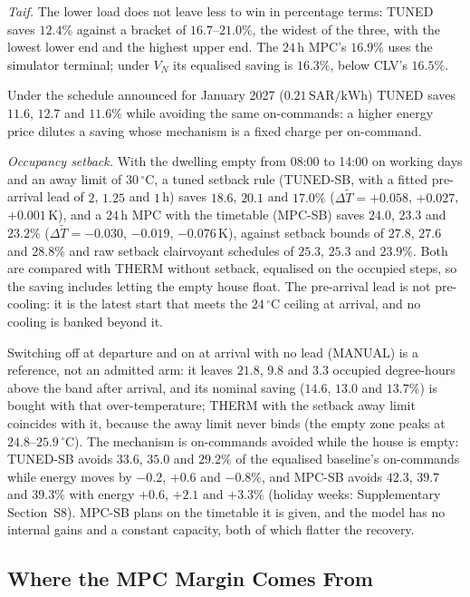 \documentclass[3p,twocolumn,number]{elsarticle}
\newcommand{\SAR}{\text{SAR}}
\newcommand{\kWh}{\text{kWh}}
\begin{document}
\emph{Taif.} The lower load does not leave less to win in percentage terms: TUNED saves $12.4\%$ against a bracket of $16.7$--$21.0\%$, the widest of the three, with the lowest lower end and the highest upper end. The $24\,$h MPC's $16.9\%$ uses the simulator terminal; under $V_N$ its equalised saving is $16.3\%$, below CLV's $16.5\%$.

Under the schedule announced for January 2027 ($0.21\,\SAR/\kWh$) TUNED saves $11.6$, $12.7$ and $11.6\%$ while avoiding the same on-commands: a higher energy price dilutes a saving whose mechanism is a fixed charge per on-command.

\emph{Occupancy setback.} With the dwelling empty from 08:00 to 14:00 on working days and an away limit of $30\,^\circ$C, a tuned setback rule (TUNED-SB, with a fitted pre-arrival lead of $2$, $1.25$ and $1\,$h) saves $18.6$, $20.1$ and $17.0\%$ ($\Delta\tilde T=+0.058$, $+0.027$, $+0.001\,$K), and a $24\,$h MPC with the timetable (MPC-SB) saves $24.0$, $23.3$ and $23.2\%$ ($\Delta\tilde T=-0.030$, $-0.019$, $-0.076\,$K), against setback bounds of $27.8$, $27.6$ and $28.8\%$ and raw setback clairvoyant schedules of $25.3$, $25.3$ and $23.9\%$. Both are compared with THERM without setback, equalised on the occupied steps, so the saving includes letting the empty house float. The pre-arrival lead is not pre-cooling: it is the latest start that meets the $24\,^\circ$C ceiling at arrival, and no cooling is banked beyond it.

Switching off at departure and on at arrival with no lead (MANUAL) is a reference, not an admitted arm: it leaves $21.8$, $9.8$ and $3.3$ occupied degree-hours above the band after arrival, and its nominal saving ($14.6$, $13.0$ and $13.7\%$) is bought with that over-temperature; THERM with the setback away limit coincides with it, because the away limit never binds (the empty zone peaks at $24.8$--$25.9\,^\circ$C). The mechanism is on-commands avoided while the house is empty: TUNED-SB avoids $33.6$, $35.0$ and $29.2\%$ of the equalised baseline's on-commands while energy moves by $-0.2$, $+0.6$ and $-0.8\%$, and MPC-SB avoids $42.3$, $39.7$ and $39.3\%$ with energy $+0.6$, $+2.1$ and $+3.3\%$ (holiday weeks: Supplementary Section~S8). MPC-SB plans on the timetable it is given, and the model has no internal gains and a constant capacity, both of which flatter the recovery.


\subsection{Where the MPC Margin Comes From}
\label{subsec:ladder}
\end{document}
